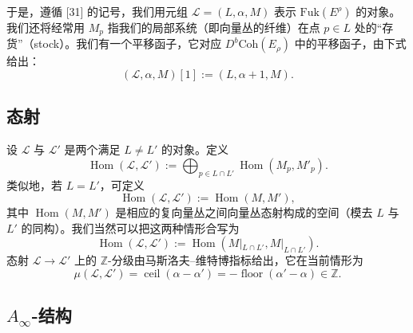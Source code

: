 \documentclass[11pt,a4paper]{article}
\theoremstyle{plain}
\theoremstyle{definition}
\begin{document}
于是，遵循 [31] 的记号，我们用元组 $\mathcal{L}=(L,\alpha,M)$ 表示 $\mathrm{Fuk}(E^\rho)$ 的对象。我们还将经常用 $M_p$ 指我们的局部系统（即向量丛的纤维）在点 $p\in L$ 处的“存货”（stock）。我们有一个平移函子，它对应 $D^b\mathrm{Coh}(E_\rho)$ 中的平移函子，由下式给出：
\[
(\mathcal{L},\alpha,M)[1]:=(L,\alpha+1,M).
\]

\subsection{态射}

设 $\mathcal{L}$ 与 $\mathcal{L}'$ 是两个满足 $L\ne L'$ 的对象。定义
\[
\operatorname{Hom}(\mathcal{L},\mathcal{L}'):=\bigoplus_{p\in L\cap L'}\operatorname{Hom}(M_p,M'_p).
\]
类似地，若 $L=L'$，可定义
\[
\operatorname{Hom}(\mathcal{L},\mathcal{L}'):=\operatorname{Hom}(M,M'),
\]
其中 $\operatorname{Hom}(M,M')$ 是相应的复向量丛之间向量丛态射构成的空间（模去 $L$ 与 $L'$ 的同构）。我们当然可以把这两种情形合写为
\[
\operatorname{Hom}(\mathcal{L},\mathcal{L}'):=\operatorname{Hom}(M|_{L\cap L'},M|_{L\cap L'}).
\]
态射 $\mathcal{L}\to\mathcal{L}'$ 上的 $\mathbb{Z}$-分级由马斯洛夫–维特博指标给出，它在当前情形为
\[
\mu(\mathcal{L},\mathcal{L}')=\operatorname{ceil}(\alpha-\alpha')=-\operatorname{floor}(\alpha'-\alpha)\in\mathbb{Z}.
\]

\subsection{$A_\infty$-结构}
\end{document}
